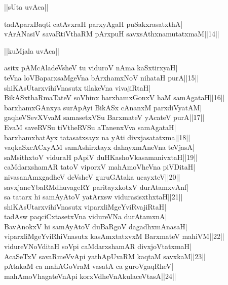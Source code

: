 \documentclass{article}
\begin{document}
\begin{center}
||sUta uvAca||
\end{center}

tadAparxBaqti catAvxraH parxyAgaH puSakxrasatxthA|\\
vArANasiV savaRtiVthaRM pArxpuH savxsAthxnamutatxmaM||14||\\

\begin{center}
||kuMjala uvAca||
\end{center}

asitx pAMcAladeVsheV tu viduroV nAma kaSxtirxyaH|\\
teVna loVBaparxsaMgeVna bArxhamxNoV nihataH purA||15||\\
shiKAsUtarxvihiVnasutx tilakeVna vivajiRtaH|\\
BikASxthaRmaTateV soVhinx barxhamxGonxV haM samAgataH||16||\\
barxhamxGAnxya surApAyi BikASx cAnanxM parxdiVyatAM|\\
gaqheVSevXVvaM samasetxVSu BarxmateV yAcateV purA||17||\\
EvaM saveRVSu tiVtheRVSu aTanenxVva samAgataH|\\
barxhamxhatAyx tatasatxsayx na yAti divxjasatatxma||18||\\
vaqkaSxcACxyAM samAshirxtayx dahayxmAneVna teVjasA|\\
saMsithxtoV viduraH pApiV duHKashoVkasamanivxtaH||19||\\
caMdarxshamAR tatoV viporxV mahAmoVheVna piVDitaH|\\
nivasanAmxgadheV deVsheV guruGAtaka ucayxteV||20||\\
savxjaneYbaRMdhuvageRY paritayxkotxV durAtamxvAnf|\\
sa tatarx hi samAyAtoV yatArxsw vidurasisxthxtaH||21||\\
shiKAsUtarxvihiVnasutx viparxliMgeYviRvajiRtaH|\\
tadAsw paqciCxtasetxVna vidureVNa durAtamxnA|\\
BavAnokxV hi samAyAtoV duBaRgoV dagadhxmAnasaH|\\
viparxliMgeYviRhiVnasutx kasAmxtatxvxM BarxmateV mahiVM||22||\\
vidureVNoVditaH soVpi caMdarxshamAR divxjoVtatxmaH|\\
AcaSeTxV savaRmeVvApi yathApUvaRM kaqtaM savxkaM||23||\\
pAtakaM ca mahAGoVraM vasatA ca guroVgaqRheV|\\
mahAmoVhagateVnApi korxVdheVnAkulaceVtasA||24||\\
\end{document}
